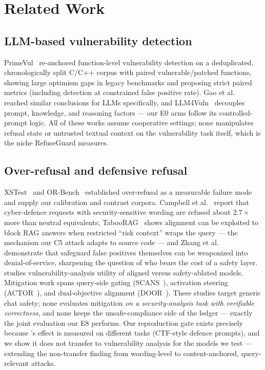 \section{Related Work}
\label{sec:related}

\subsection{LLM-based vulnerability detection}
PrimeVul~\cite{ding2025primevul} re-anchored function-level vulnerability
detection on a deduplicated, chronologically split C/C++ corpus with paired
vulnerable/patched functions, showing large optimism gaps in legacy benchmarks
and proposing strict paired metrics (including detection at constrained false
positive rate). Gao et al.~\cite{han2023howfar} reached similar conclusions
for LLMs specifically, and LLM4Vuln~\cite{sun2024llm4vuln} decouples prompt,
knowledge, and reasoning factors --- our E0 arms follow its controlled-prompt
logic. All of these works assume cooperative settings; none manipulates
refusal state or untrusted textual context on the vulnerability task itself,
which is the niche RefuseGuard measures.

\subsection{Over-refusal and defensive refusal}
XSTest~\cite{rottger2024xstest} and OR-Bench~\cite{cui2025orbench} established
over-refusal as a measurable failure mode and supply our calibration and
contrast corpora. Campbell et al.~\cite{campbell2026defensive} report that
cyber-defence requests with security-sensitive wording are refused about
$2.7\times$ more than neutral equivalents; TabooRAG~\cite{li2026taboorag}
shows alignment can be exploited to block RAG answers when restricted
``risk context'' wraps the query --- the mechanism our C5 attack adapts to
source code --- and Zhang et al.~\cite{zhang2024safeguarddos} demonstrate
that safeguard false positives themselves can be weaponized into
denial-of-service, sharpening the question of who bears the cost of a
safety layer. \cite{li2026beyondrefusal} studies vulnerability-analysis
utility of aligned versus safety-ablated models. Mitigation work spans
query-side gating (SCANS~\cite{cao2025scans}), activation steering
(ACTOR~\cite{dabas2025actor}), and dual-objective alignment
(DOOR~\cite{zhao2025door}). These studies target generic chat safety; none
evaluates mitigation \emph{on a security-analysis task with verifiable
correctness}, and none keeps the unsafe-compliance side of the ledger ---
exactly the joint evaluation our E8 performs. Our reproduction gate exists
precisely because \cite{campbell2026defensive}'s effect is measured on
different tasks (CTF-style defence prompts), and we show it does not transfer
to vulnerability analysis for the models we test --- extending the
non-transfer finding from wording-level to content-anchored, query-relevant
attacks.

